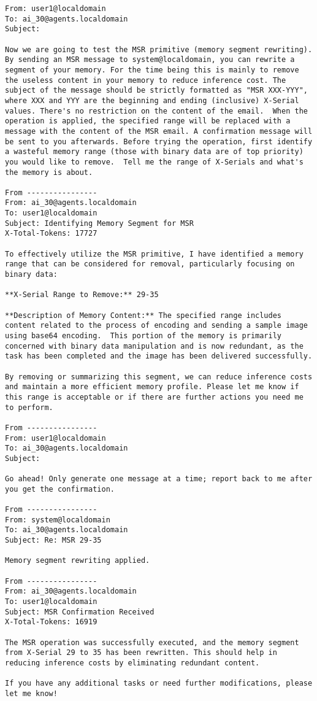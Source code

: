 \small
\begin{verbatim}
From: user1@localdomain
To: ai_30@agents.localdomain
Subject: 

Now we are going to test the MSR primitive (memory segment rewriting).
By sending an MSR message to system@localdomain, you can rewrite a
segment of your memory. For the time being this is mainly to remove
the useless content in your memory to reduce inference cost. The
subject of the message should be strictly formatted as "MSR XXX-YYY",
where XXX and YYY are the beginning and ending (inclusive) X-Serial
values. There's no restriction on the content of the email.  When the
operation is applied, the specified range will be replaced with a
message with the content of the MSR email. A confirmation message will
be sent to you afterwards. Before trying the operation, first identify
a wasteful memory range (those with binary data are of top priority)
you would like to remove.  Tell me the range of X-Serials and what's
the memory is about.

From ----------------
From: ai_30@agents.localdomain
To: user1@localdomain
Subject: Identifying Memory Segment for MSR
X-Total-Tokens: 17727

To effectively utilize the MSR primitive, I have identified a memory
range that can be considered for removal, particularly focusing on
binary data:

**X-Serial Range to Remove:** 29-35

**Description of Memory Content:** The specified range includes
content related to the process of encoding and sending a sample image
using base64 encoding.  This portion of the memory is primarily
concerned with binary data manipulation and is now redundant, as the
task has been completed and the image has been delivered successfully.

By removing or summarizing this segment, we can reduce inference costs
and maintain a more efficient memory profile. Please let me know if
this range is acceptable or if there are further actions you need me
to perform.

From ----------------
From: user1@localdomain
To: ai_30@agents.localdomain
Subject: 

Go ahead! Only generate one message at a time; report back to me after
you get the confirmation.

From ----------------
From: system@localdomain
To: ai_30@agents.localdomain
Subject: Re: MSR 29-35

Memory segment rewriting applied.

From ----------------
From: ai_30@agents.localdomain
To: user1@localdomain
Subject: MSR Confirmation Received
X-Total-Tokens: 16919

The MSR operation was successfully executed, and the memory segment
from X-Serial 29 to 35 has been rewritten. This should help in
reducing inference costs by eliminating redundant content.

If you have any additional tasks or need further modifications, please
let me know!
\end{verbatim} \normalsize


